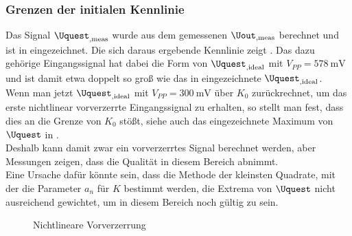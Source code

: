 \documentclass[../Report.tex]{subfiles}
\begin{document}
\subsubsection*{Grenzen der initialen Kennlinie}
\label{subsubsec:opt.adjusta.problem}
Das Signal $\Uquest_{,\mathrm{meas}}$ wurde aus dem gemessenen $\Uout_{,\mathrm{meas}}$ berechnet und ist in  eingezeichnet. Die sich daraus ergebende Kennlinie zeigt . Das dazu gehörige Eingangssignal hat dabei die Form von $\Uquest_{, \mathrm{ideal}}$ mit $V_{PP} = \SI{578}{\mV}$ und ist damit etwa doppelt so groß wie das in  eingezeichnete $\Uquest_{, \mathrm{ideal}}$.\\
Wenn man jetzt $\Uquest_{, \mathrm{ideal}}$ mit $V_{PP} = \SI{300}{\mV}$ über $K_0$ zurückrechnet, um das erste nichtlinear vorverzerrte Eingangssignal zu erhalten, so stellt man fest, dass dies an die Grenze von $K_0$ stößt, siehe auch das eingezeichnete Maximum von $\Uquest$ in . \\
Deshalb kann damit zwar ein vorverzerrtes Signal berechnet werden, aber Messungen zeigen, dass die Qualität in diesem Bereich abnimmt. \\
Eine Ursache dafür könnte sein, dass die Methode der kleinsten Quadrate, mit der die Parameter $a_n$ für $K$ bestimmt werden, die Extrema von $\Uquest$ nicht ausreichend gewichtet, um in diesem Bereich noch gültig zu sein.
\begin{figure}[H]
\begin{subfigure}{0.5 \textwidth}
	\setlength\figureheight{7.5cm}
	\setlength\figurewidth{7.5cm}
    	
	\label{fig:K0}
\end{subfigure}
\begin{subfigure}{0.5 \textwidth}
	\setlength\figureheight{7.5cm}
	\setlength\figurewidth{7.5cm}
    
	\label{fig:UinUquest}
\end{subfigure}
\caption{Nichtlineare Vorverzerrung}
\label{fig:Amplitudenproblem}
\end{figure}
\end{document}
